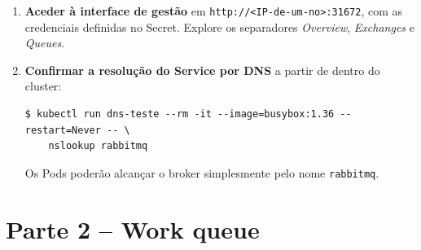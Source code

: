 \documentclass[11pt,a4paper]{article}
\begin{document}
\begin{enumerate}[label=\arabic*.]
  \item \textbf{Aceder à interface de gestão} em \texttt{http://<IP-de-um-no>:31672}, com as credenciais definidas no Secret. Explore os separadores \emph{Overview}, \emph{Exchanges} e \emph{Queues}.

  \item \textbf{Confirmar a resolução do Service por DNS} a partir de dentro do cluster:
\begin{lstlisting}
$ kubectl run dns-teste --rm -it --image=busybox:1.36 --restart=Never -- \
    nslookup rabbitmq
\end{lstlisting}
  Os Pods poderão alcançar o broker simplesmente pelo nome \texttt{rabbitmq}.

\end{enumerate}

\section{Parte 2 -- Work queue}
\end{document}
